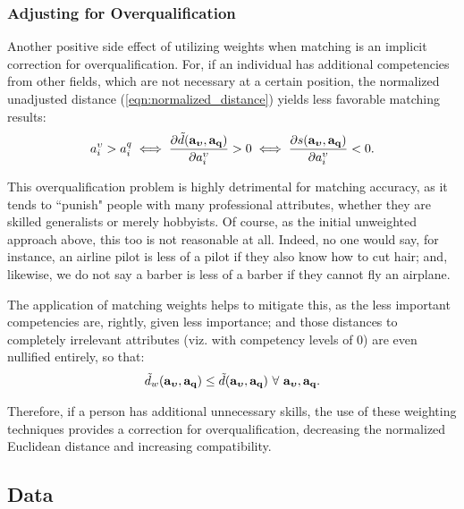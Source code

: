 \documentclass{article}
\begin{document}
\subsubsection{Adjusting for Overqualification}
Another positive side effect of utilizing weights when matching is an implicit correction for overqualification. For, if an individual has additional competencies from other fields, which are not necessary at a certain position, the normalized unadjusted distance (\ref{eqn:normalized_distance}) yields less favorable matching results:
\begin{gather}
\label{eqn:distance_derivative}
    a_{i}^{\upsilon} > a_{i}^{q} \iff
    \frac{
    \partial{\tilde{d}(\vb{a_{\boldsymbol{\upsilon}}}, \vb{a_{q}})}}
    {\partial{a_{i}^{\upsilon}}} > 0 \iff
    \frac{
    \partial{s(\vb{a_{\boldsymbol{\upsilon}}}, \vb{a_{q}})}}
    {\partial{a_{i}^{\upsilon}}} < 0
.\end{gather}

This overqualification problem is highly detrimental for matching accuracy, as it tends to ``punish" people with many professional attributes, whether they are skilled generalists or merely hobbyists. Of course, as the initial unweighted approach above, this too is not reasonable at all. Indeed, no one would say, for instance, an airline pilot is less of a pilot if they also know how to cut hair; and, likewise, we do not say a barber is less of a barber if they cannot fly an airplane.

The application of matching weights helps to mitigate this, as the less important competencies are, rightly, given less importance; and those distances to completely irrelevant attributes (viz. with competency levels of 0) are even nullified entirely, so that:
\begin{gather}
\label{eqn:unweighted_vs_weighted_distance}
    \tilde{d}_w(\vb{a_{\boldsymbol{\upsilon}}}, \vb{a_{q}}) \leq
    \tilde{d}(\vb{a_{\boldsymbol{\upsilon}}}, \vb{a_{q}}) \ \forall \ \vb{a_{\boldsymbol{\upsilon}}}, \vb{a_{q}}
.\end{gather}

Therefore, if a person has additional unnecessary skills, the use of these weighting techniques provides a correction for overqualification, decreasing the normalized Euclidean distance and increasing compatibility.

\subsection{Data}
\end{document}
